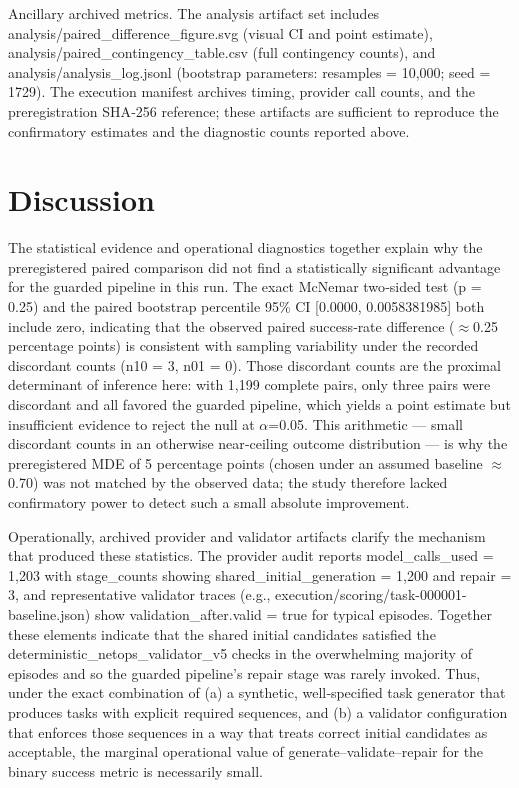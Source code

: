 \documentclass[conference]{IEEEtran}
\begin{document}
Ancillary archived metrics. The analysis artifact set includes analysis/paired\_difference\_figure.svg (visual CI and point estimate), analysis/paired\_contingency\_table.csv (full contingency counts), and analysis/analysis\_log.jsonl (bootstrap parameters: resamples = 10,000; seed = 1729). The execution manifest archives timing, provider call counts, and the preregistration SHA‑256 reference; these artifacts are sufficient to reproduce the confirmatory estimates and the diagnostic counts reported above.

\section{Discussion}
The statistical evidence and operational diagnostics together explain why the preregistered paired comparison did not find a statistically significant advantage for the guarded pipeline in this run. The exact McNemar two‑sided test (p = 0.25) and the paired bootstrap percentile 95\% CI [0.0000, 0.0058381985] both include zero, indicating that the observed paired success‑rate difference (\ensuremath{\approx}0.25 percentage points) is consistent with sampling variability under the recorded discordant counts (n10 = 3, n01 = 0). Those discordant counts are the proximal determinant of inference here: with 1,199 complete pairs, only three pairs were discordant and all favored the guarded pipeline, which yields a point estimate but insufficient evidence to reject the null at \ensuremath{\alpha}=0.05. This arithmetic --- small discordant counts in an otherwise near‑ceiling outcome distribution --- is why the preregistered MDE of 5 percentage points (chosen under an assumed baseline \ensuremath{\approx}0.70) was not matched by the observed data; the study therefore lacked confirmatory power to detect such a small absolute improvement.

Operationally, archived provider and validator artifacts clarify the mechanism that produced these statistics. The provider audit reports model\_calls\_used = 1,203 with stage\_counts showing shared\_initial\_generation = 1,200 and repair = 3, and representative validator traces (e.g., execution/scoring/task-000001-baseline.json) show validation\_after.valid = true for typical episodes. Together these elements indicate that the shared initial candidates satisfied the deterministic\_netops\_validator\_v5 checks in the overwhelming majority of episodes and so the guarded pipeline's repair stage was rarely invoked. Thus, under the exact combination of (a) a synthetic, well‑specified task generator that produces tasks with explicit required sequences, and (b) a validator configuration that enforces those sequences in a way that treats correct initial candidates as acceptable, the marginal operational value of generate--validate--repair for the binary success metric is necessarily small.
\end{document}
